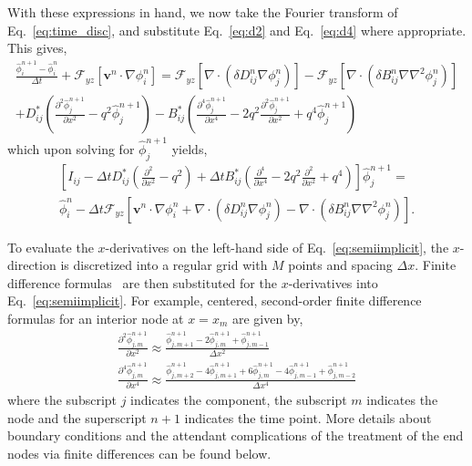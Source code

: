\documentclass[journal=mamobx,manuscript=suppinfo]{achemso}
\begin{document}
With these expressions in hand, we now take the Fourier transform of Eq.~\ref{eq:time_disc}, and substitute Eq.~\ref{eq:d2} and Eq.~\ref{eq:d4} where appropriate.
This gives,
\begin{multline} \label{eq:FT}
  \frac{\hat{\phi}_{i}^{n+1} - \hat{\phi}_{i}^{n}}{\Delta t} + 
  \mathcal{F}_{yz}\left [ \bm{v}^{n} \cdot \nabla \phi_{i}^{n} \right ] = 
    \mathcal{F}_{yz}\left [ \nabla \cdot \left ( \delta D_{ij}^{n} \nabla \phi_{j}^{n} \right ) \right ] 
    - \mathcal{F}_{yz}\left [ \nabla \cdot \left ( \delta B_{ij}^{n} \nabla \nabla^{2} \phi_{j}^{n} \right ) \right ] \\
    + D^{*}_{ij} \left ( \frac{\partial^2 \hat{\phi}_{j}^{n+1}}{\partial x^2} - q^{2} \hat{\phi}_{j}^{n+1} \right )
    - B^{*}_{ij} \left ( \frac{ \partial^{4} \hat{\phi}_{j}^{n+1} }{\partial x^{4}}
    - 2 q^{2} \frac{\partial^{2} \hat{\phi}_{j}^{n+1}}{\partial x^{2}} + q^{4} \hat{\phi}_{j}^{n+1} \right )
\end{multline}
which upon solving for $\hat{\phi}_{j}^{n+1}$ yields,
\begin{multline} \label{eq:semiimplicit}
    \left [ I_{ij} 
    - \Delta t D^{*}_{ij} \left ( \frac{\partial^2 }{\partial x^2} - q^{2} \right )
    + \Delta t B^{*}_{ij} \left ( \frac{ \partial^{4} }{\partial x^{4}} 
                                  - 2 q^{2} \frac{\partial^{2}}{\partial x^{2}} 
                                  + q^{4} \right ) \right ] 
    \hat{\phi}_{j}^{n+1} = \\ 
      \hat{\phi}_{i}^{n}
    - \Delta t \mathcal{F}_{yz}\left [ \bm{v}^{n} \cdot \nabla \phi_{i}^{n} 
    + \nabla \cdot \left ( \delta D_{ij}^{n} \nabla \phi_{j}^{n} \right )
    - \nabla \cdot \left ( \delta B_{ij}^{n} \nabla \nabla^{2} \phi_{j}^{n} \right ) \right ] \mathrm{.}
\end{multline}

To evaluate the $x$-derivatives on the left-hand side of Eq.~\ref{eq:semiimplicit}, the $x$-direction is discretized into a regular grid with $M$ points and spacing $\Delta x$.
Finite difference formulas~\cite{Fornberg1988} are then substituted for the $x$-derivatives into Eq.~\ref{eq:semiimplicit}.
For example, centered, second-order finite difference formulas for an interior node at $x = x_{m}$ are given by,
\begin{gather}
  \frac{\partial^2 \hat{\phi}_{j,m}^{n+1}}{\partial x^2} \approx \frac{\hat{\phi}_{j, m+1}^{n+1} - 2 \hat{\phi}_{j, m}^{n+1} + \hat{\phi}_{j, m-1}^{n+1}}{\Delta x^{2}} \label{eq:d2_FD}\\
  \frac{\partial^4 \hat{\phi}_{j,m}^{n+1}}{\partial x^4} \approx \frac{\hat{\phi}_{j, m+2}^{n+1} - 4 \hat{\phi}_{j, m+1}^{n+1} + 6 \hat{\phi}_{j, m}^{n+1} - 4 \hat{\phi}_{j, m-1}^{n+1} + \hat{\phi}_{j, m-2}^{n+1}}{\Delta x^{4}}
\end{gather}
where the subscript $j$ indicates the component, the subscript $m$ indicates the node and the superscript $n+1$ indicates the time point.
More details about boundary conditions and the attendant complications of the treatment of the end nodes via finite differences can be found below.
\end{document}
